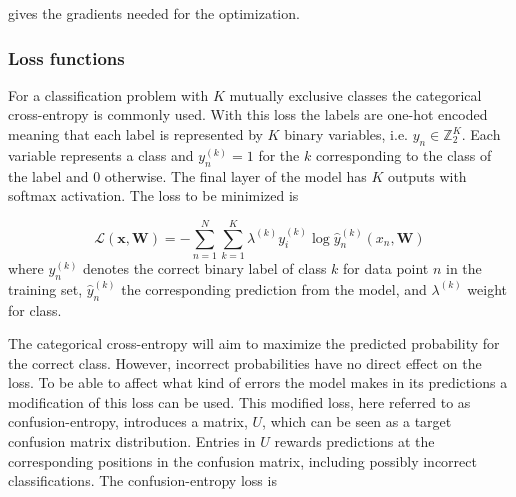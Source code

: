 gives the gradients needed for the optimization.


\subsubsection{Loss functions}
For a classification problem with $K$ mutually exclusive classes the categorical cross-entropy is commonly used. With this loss the labels are one-hot encoded meaning that each label is represented by $K$ binary variables, i.e. $y_n \in \mathbb{Z}_2^K$. Each variable represents a class and $y_n^{(k)} = 1$ for the $k$ corresponding to the class of the label and 0 otherwise. The final layer of the model has $K$ outputs with softmax activation. The loss to be minimized is \cite{Bishop2006}

\begin{equation}
 \mathcal{L}(\pmb{x}, \pmb{W}) = - \sum_{n=1}^N \sum_{k=1}^K \lambda^{(k)} y_i^{(k)} \log \hat{y}_n^{(k)}(x_n, \pmb{W})
 \label{eq:cat-cross-entr}
\end{equation}
where $y_n^{(k)}$ denotes the correct binary label of class $k$ for data point $n$ in the training set, $\hat{y}_n^{(k)}$ the corresponding prediction from the model, and $\lambda^{(k)}$ weight for class.

The categorical cross-entropy will aim to maximize the predicted probability for the correct class. However, incorrect probabilities have no direct effect on the loss. To be able to affect what kind of errors the model makes in its predictions a modification of this loss can be used. This modified loss, here referred to as confusion-entropy, introduces a matrix, $U$, which can be seen as a target confusion matrix distribution. Entries in $U$ rewards predictions at the corresponding positions in the confusion matrix, including possibly incorrect classifications. The confusion-entropy loss is \cite{Abbass2018}

